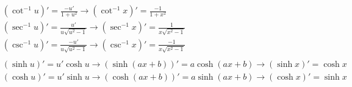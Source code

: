 \begin{multicols}{2}
\begin{align*}
&(\cot^{-1} u)' = \frac{-u'}{1+u^2} \longrightarrow (\cot^{-1}x)' = \frac{-1}{1+x^2} \\
&(\sec^{-1}u)' = \frac{u'}{u\sqrt{u^2-1}} \longrightarrow (\sec^{-1}x)' = \frac{1}{x\sqrt{x^2-1}} \\
&(\csc^{-1}u)' = \frac{-u'}{u\sqrt{u^2-1}} \longrightarrow (\csc^{-1}x)' = \frac{-1}{x\sqrt{x^2-1}} \\
\\
&(\sinh u)' = u'\cosh u \longrightarrow (\sinh(ax+b))' = a\cosh(ax+b) \longrightarrow (\sinh x)' = \cosh x \\
&(\cosh u)' = u'\sinh u \longrightarrow (\cosh(ax+b))' = a\sinh(ax+b) \longrightarrow (\cosh x)' = \sinh x  \\
\end{align*}
\end{multicols}
